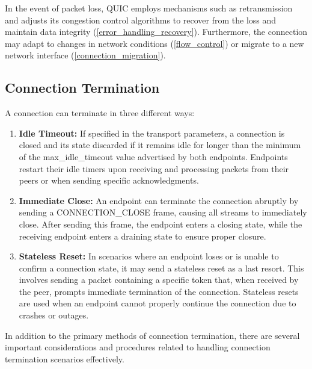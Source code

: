 In the event of packet loss, QUIC employs mechanisms such as retransmission and adjusts its congestion control algorithms to recover from the loss and maintain data integrity (\ref{error_handling_recovery}). Furthermore, the connection may adapt to changes in network conditions (\ref{flow_control}) or migrate to a new network interface (\ref{connection_migration}).

\subsection{Connection Termination}

A connection can terminate in three different ways:

\begingroup
\renewcommand\labelenumi{(\theenumi)}
\begin{enumerate}
\item \textbf{Idle Timeout:} If specified in the transport parameters, a connection is closed and its state discarded if it remains idle for longer than the minimum of the max\_idle\_timeout value advertised by both endpoints. Endpoints restart their idle timers upon receiving and processing packets from their peers or when sending specific acknowledgments. \cite[57]{rfc9000} \label{idle_timeout}
\item \textbf{Immediate Close:} An endpoint can terminate the connection abruptly by sending a CONNECTION\_CLOSE frame, causing all streams to immediately close. After sending this frame, the endpoint enters a closing state, while the receiving endpoint enters a draining state to ensure proper closure. \cite[58]{rfc9000} \label{immediate_close}
\item \textbf{Stateless Reset:} In scenarios where an endpoint loses or is unable to confirm a connection state, it may send a stateless reset as a last resort. This involves sending a packet containing a specific token that, when received by the peer, prompts immediate termination of the connection. Stateless resets are used when an endpoint cannot properly continue the connection due to crashes or outages. \cite[61]{rfc9000} \label{stateless_reset}
\end{enumerate}
\endgroup

In addition to the primary methods of connection termination, there are several important considerations and procedures related to handling connection termination scenarios effectively.

